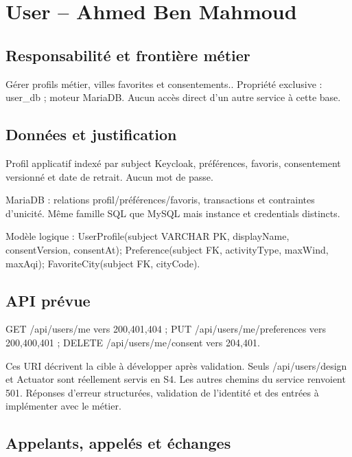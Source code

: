 \documentclass[10pt,a4paper]{article}
\begin{document}
\section*{User  --  Ahmed Ben Mahmoud}

\subsection*{Responsabilité et frontière métier}

Gérer profils métier, villes favorites et consentements.. Propriété exclusive : user\_db ; moteur MariaDB. Aucun accès direct d'un autre service à cette base.\par

\subsection*{Données et justification}

Profil applicatif indexé par subject Keycloak, préférences, favoris, consentement versionné et date de retrait. Aucun mot de passe.\par

MariaDB : relations profil/préférences/favoris, transactions et contraintes d'unicité. Même famille SQL que MySQL mais instance et credentials distincts.\par

Modèle logique : UserProfile(subject VARCHAR PK, displayName, consentVersion, consentAt); Preference(subject FK, activityType, maxWind, maxAqi); FavoriteCity(subject FK, cityCode).\par

\subsection*{API prévue}

GET /api/users/me  vers  200,401,404 ; PUT /api/users/me/preferences  vers  200,400,401 ; DELETE /api/users/me/consent  vers  204,401.\par

Ces URI décrivent la cible à développer après validation. Seuls /api/users/design et Actuator sont réellement servis en S4. Les autres chemins du service renvoient 501. Réponses d'erreur structurées, validation de l'identité et des entrées à implémenter avec le métier.\par

\subsection*{Appelants, appelés et échanges}
\end{document}
